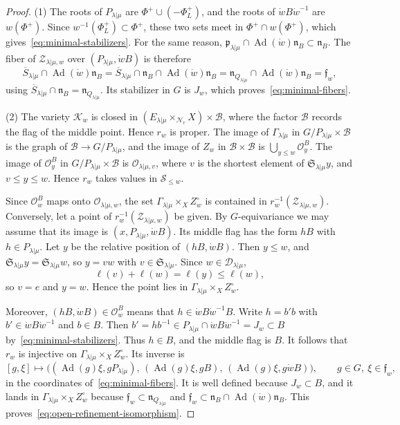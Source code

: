 \documentclass[11pt,a4paper]{amsart}
\theoremstyle{definition}
\theoremstyle{remark}
\newcommand{\N}{\mathcal N}
\newcommand{\B}{\mathcal B}
\newcommand{\Ad}{\operatorname{Ad}}
\newcommand{\lm}{\lambda|\mu}
\numberwithin{equation}{section}
\begin{document}
\begin{proof}
(1) The roots of $P_{\lm}$ are $\Phi^+\cup(-\Phi_L^+)$, and the roots of
$\dot wB\dot w^{-1}$ are $w(\Phi^+)$. Since
$w^{-1}(\Phi_L^+)\subset\Phi^+$, these two sets meet in
$\Phi^+\cap w(\Phi^+)$, which gives~\eqref{eq:minimal-stabilizers}. For the same reason,
$\mathfrak p_{\lm}\cap\Ad(\dot w)\mathfrak n_B\subset\mathfrak n_B$. The
fiber of $\mathscr Z_{\lm,w}$ over $(P_{\lm},\dot wB)$ is therefore
$$
\overline S_{\lm}\cap\Ad(\dot w)\mathfrak n_B
=\overline S_{\lm}\cap\mathfrak n_B\cap\Ad(\dot w)\mathfrak n_B
=\mathfrak n_{Q_{\lm}}\cap\Ad(\dot w)\mathfrak n_B=\mathfrak f_w,
$$
using $\overline S_{\lm}\cap\mathfrak n_B=\mathfrak n_{Q_{\lm}}$. Its
stabilizer in $G$ is $J_w$, which proves~\eqref{eq:minimal-fibers}.

(2) The variety $\mathscr K_w$ is closed in
$(E_{\lm}\times_{\N_r}X)\times\B$, where the factor $\B$ records the flag of
the middle point. Hence $r_w$ is proper. The image of $\Gamma_{\lm}$ in
$G/P_{\lm}\times\B$ is the graph of $\B\to G/P_{\lm}$, and the image of
$Z_w$ in $\B\times\B$ is $\bigcup_{y\le w}\mathcal O^B_y$. The image of $\mathcal O^B_y$ in
$G/P_{\lm}\times\B$ is $\mathcal O_{\lm,v}$, where $v$ is the shortest
element of $\mathfrak S_{\lm}y$, and $v\le y\le w$. Hence $r_w$ takes
values in $\mathscr S_{\le w}$.

Since $\mathcal O^B_w$ maps onto $\mathcal O_{\lm,w}$, the set
$\Gamma_{\lm}\times_XZ_w^\circ$ is contained in
$r_w^{-1}(\mathscr Z_{\lm,w})$. Conversely, let a point of
$r_w^{-1}(\mathscr Z_{\lm,w})$ be given. By $G$-equivariance we may assume
that its image is $(x,P_{\lm},\dot wB)$. Its middle flag has the form
$hB$ with $h\in P_{\lm}$. Let $y$ be the relative position of
$(hB,\dot wB)$. Then $y\le w$, and $\mathfrak S_{\lm}y=\mathfrak S_{\lm}w$,
so $y=vw$ with $v\in\mathfrak S_{\lm}$. Since $w\in\mathcal D_{\lm}$,
$$
\ell(v)+\ell(w)=\ell(y)\le\ell(w),
$$
so $v=e$ and $y=w$. Hence the point lies in
$\Gamma_{\lm}\times_XZ_w^\circ$.

Moreover, $(hB,\dot wB)\in\mathcal O^B_w$ means that
$h\in\dot wB\dot w^{-1}B$. Write $h=b'b$ with
$b'\in\dot wB\dot w^{-1}$ and $b\in B$. Then
$b'=hb^{-1}\in P_{\lm}\cap\dot wB\dot w^{-1}=J_w\subset B$
by~\eqref{eq:minimal-stabilizers}. Thus $h\in B$, and the middle flag is
$B$. It follows that $r_w$ is injective on
$\Gamma_{\lm}\times_XZ_w^\circ$. Its inverse is
$$
[g,\xi]\longmapsto\bigl((\Ad(g)\xi,gP_{\lm}),\,(\Ad(g)\xi,gB),\,
(\Ad(g)\xi,g\dot wB)\bigr),\qquad g\in G,\ \xi\in\mathfrak f_w,
$$
in the coordinates of~\eqref{eq:minimal-fibers}. It is well defined
because $J_w\subset B$, and it lands in $\Gamma_{\lm}\times_XZ_w^\circ$
because $\mathfrak f_w\subset\mathfrak n_{Q_{\lm}}$ and
$\mathfrak f_w\subset\mathfrak n_B\cap\Ad(\dot w)\mathfrak n_B$. This
proves~\eqref{eq:open-refinement-isomorphism}.
\end{proof}
\end{document}
